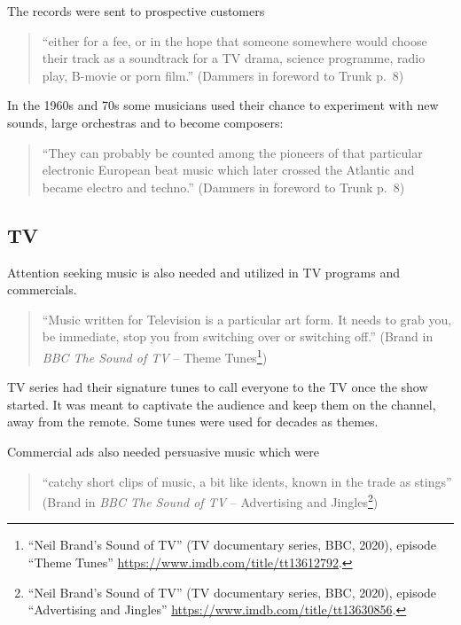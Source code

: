 \documentclass[a4paper,
fontsize=11pt,
oneside,
numbers=noperiodatend,
parskip=half-,
bibliography=totoc,
final
]{scrartcl}
\begin{document}
The records were sent to prospective customers

\begin{quote}
\enquote{either for a fee, or in the hope that someone somewhere would
choose their track as a soundtrack for a TV drama, science programme,
radio play, B-movie or porn film.} (Dammers in foreword to Trunk p.~8)
\end{quote}

In the 1960s and 70s some musicians used their chance to experiment with
new sounds, large orchestras and to become composers:

\begin{quote}
\enquote{They can probably be counted among the pioneers of that
particular electronic European beat music which later crossed the
Atlantic and became electro and techno.} (Dammers in foreword to Trunk
p.~8)
\end{quote}

\hypertarget{tv}{%
\subsection{TV}\label{tv}}

Attention seeking music is also needed and utilized in TV programs and
commercials.

\begin{quote}
\enquote{Music written for Television is a particular art form. It needs
to grab you, be immediate, stop you from switching over or switching
off.} (Brand in \emph{BBC The Sound of TV} -- Theme Tunes\footnote{\enquote{Neil
  Brand's Sound of TV} (TV documentary series, BBC, 2020), episode
  \enquote{Theme Tunes} \url{https://www.imdb.com/title/tt13612792}.})
\end{quote}

TV series had their signature tunes to call everyone to the TV once the
show started. It was meant to captivate the audience and keep them on
the channel, away from the remote. Some tunes were used for decades as
themes.

Commercial ads also needed persuasive music which were

\begin{quote}
\enquote{catchy short clips of music, a bit like idents, known in the
trade as stings} (Brand in \emph{BBC The Sound of TV} -- Advertising and
Jingles\footnote{\enquote{Neil Brand's Sound of TV} (TV documentary
  series, BBC, 2020), episode \enquote{Advertising and Jingles}
  \url{https://www.imdb.com/title/tt13630856}.})
\end{quote}
\end{document}
